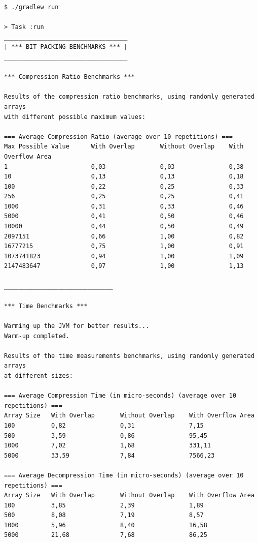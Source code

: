 \documentclass[titlepage]{article}
\begin{document}
{\lstset{basicstyle=\scriptsize\ttfamily}
\begin{lstlisting} 
$ ./gradlew run                

> Task :run
__________________________________
| *** BIT PACKING BENCHMARKS *** |
__________________________________

*** Compression Ratio Benchmarks ***

Results of the compression ratio benchmarks, using randomly generated arrays
with different possible maximum values:

=== Average Compression Ratio (average over 10 repetitions) ===
Max Possible Value      With Overlap       Without Overlap    With Overflow Area
1                       0,03               0,03               0,38              
10                      0,13               0,13               0,18              
100                     0,22               0,25               0,33              
256                     0,25               0,25               0,41              
1000                    0,31               0,33               0,46              
5000                    0,41               0,50               0,46              
10000                   0,44               0,50               0,49              
2097151                 0,66               1,00               0,82              
16777215                0,75               1,00               0,91              
1073741823              0,94               1,00               1,09              
2147483647              0,97               1,00               1,13              

______________________________

*** Time Benchmarks ***

Warming up the JVM for better results...
Warm-up completed.

Results of the time measurements benchmarks, using randomly generated arrays
at different sizes:

=== Average Compression Time (in micro-seconds) (average over 10 repetitions) ===
Array Size   With Overlap       Without Overlap    With Overflow Area
100          0,82               0,31               7,15              
500          3,59               0,86               95,45             
1000         7,02               1,68               331,11            
5000         33,59              7,84               7566,23           

=== Average Decompression Time (in micro-seconds) (average over 10 repetitions) ===
Array Size   With Overlap       Without Overlap    With Overflow Area
100          3,85               2,39               1,89              
500          8,08               7,19               8,57              
1000         5,96               8,40               16,58             
5000         21,68              7,68               86,25             


\end{lstlisting}}
\end{document}
